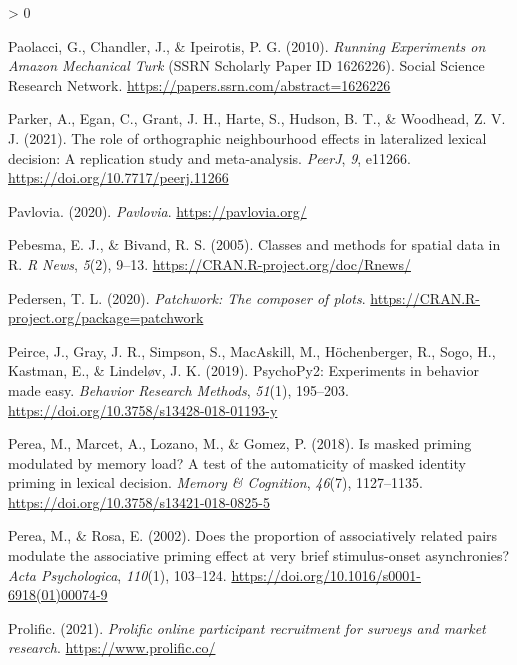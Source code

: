 \documentclass[
  english,
  man,floatsintext]{apa6}
\newlength{\cslhangindent}
\newenvironment{CSLReferences}[2] %
 {%
  \setlength{\parindent}{0pt}
  \ifodd #1 \everypar{\setlength{\hangindent}{\cslhangindent}}\ignorespaces\fi
  \ifnum #2 > 0
  \setlength{\parskip}{#2\baselineskip}
  \fi
 }%
 {}
\begin{document}
\begin{CSLReferences}{1}{0}
\leavevmode\hypertarget{ref-paolacciRunningExperimentsAmazon2010}{}%
Paolacci, G., Chandler, J., \& Ipeirotis, P. G. (2010). \emph{Running {Experiments} on {Amazon Mechanical Turk}} (SSRN Scholarly Paper ID 1626226). {Social Science Research Network}. \url{https://papers.ssrn.com/abstract=1626226}

\leavevmode\hypertarget{ref-Parker_2021}{}%
Parker, A., Egan, C., Grant, J. H., Harte, S., Hudson, B. T., \& Woodhead, Z. V. J. (2021). The role of orthographic neighbourhood effects in lateralized lexical decision: A replication study and meta-analysis. \emph{{PeerJ}}, \emph{9}, e11266. \url{https://doi.org/10.7717/peerj.11266}

\leavevmode\hypertarget{ref-pavlovia2020}{}%
Pavlovia. (2020). \emph{Pavlovia}. \url{https://pavlovia.org/}

\leavevmode\hypertarget{ref-R-sp}{}%
Pebesma, E. J., \& Bivand, R. S. (2005). Classes and methods for spatial data in {R}. \emph{R News}, \emph{5}(2), 9--13. \url{https://CRAN.R-project.org/doc/Rnews/}

\leavevmode\hypertarget{ref-R-patchwork}{}%
Pedersen, T. L. (2020). \emph{Patchwork: The composer of plots}. \url{https://CRAN.R-project.org/package=patchwork}

\leavevmode\hypertarget{ref-peirce2019}{}%
Peirce, J., Gray, J. R., Simpson, S., MacAskill, M., Höchenberger, R., Sogo, H., Kastman, E., \& Lindeløv, J. K. (2019). PsychoPy2: Experiments in behavior made easy. \emph{Behavior Research Methods}, \emph{51}(1), 195--203. \url{https://doi.org/10.3758/s13428-018-01193-y}

\leavevmode\hypertarget{ref-Perea_2018}{}%
Perea, M., Marcet, A., Lozano, M., \& Gomez, P. (2018). Is masked priming modulated by memory load? A test of the automaticity of masked identity priming in lexical decision. \emph{Memory {\&} Cognition}, \emph{46}(7), 1127--1135. \url{https://doi.org/10.3758/s13421-018-0825-5}

\leavevmode\hypertarget{ref-perea2002does}{}%
Perea, M., \& Rosa, E. (2002). Does the proportion of associatively related pairs modulate the associative priming effect at very brief stimulus-onset asynchronies? \emph{Acta Psychologica}, \emph{110}(1), 103--124. \url{https://doi.org/10.1016/s0001-6918(01)00074-9}

\leavevmode\hypertarget{ref-prolific2021}{}%
Prolific. (2021). \emph{Prolific \textbar{} online participant recruitment for surveys and market research}. \url{https://www.prolific.co/}


\end{CSLReferences}
\end{document}
